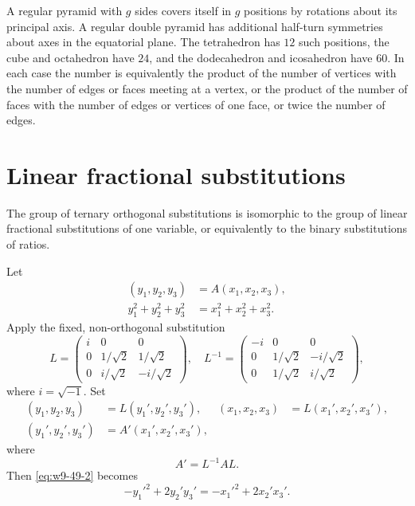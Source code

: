 \documentclass[11pt]{article}
\begin{document}
A regular pyramid with $g$ sides covers itself in $g$ positions by rotations about its principal axis.  A regular double pyramid has additional half-turn symmetries about axes in the equatorial plane.  The tetrahedron has $12$ such positions, the cube and octahedron have $24$, and the dodecahedron and icosahedron have $60$.  In each case the number is equivalently the product of the number of vertices with the number of edges or faces meeting at a vertex, or the product of the number of faces with the number of edges or vertices of one face, or twice the number of edges.

\section{Linear fractional substitutions}

The group of ternary orthogonal substitutions is isomorphic to the group of linear fractional substitutions of one variable, or equivalently to the binary substitutions of ratios.

Let
\begin{align}
 (y_1,y_2,y_3)&=A(x_1,x_2,x_3),\label{eq:w9-49-1}\\
 y_1^2+y_2^2+y_3^2&=x_1^2+x_2^2+x_3^2.\label{eq:w9-49-2}
\end{align}
Apply the fixed, non-orthogonal substitution
\begin{equation}\label{eq:w9-L}
 L=\begin{pmatrix}
 i&0&0\\
 0&1/\sqrt2&1/\sqrt2\\
 0&i/\sqrt2&-i/\sqrt2
 \end{pmatrix},
\quad
 L^{-1}=\begin{pmatrix}
 -i&0&0\\
 0&1/\sqrt2&-i/\sqrt2\\
 0&1/\sqrt2&i/\sqrt2
 \end{pmatrix},
\end{equation}
where $i=\sqrt{-1}$.  Set
\begin{align}
 (y_1,y_2,y_3)&=L(y_1',y_2',y_3'),
 & (x_1,x_2,x_3)&=L(x_1',x_2',x_3'),\label{eq:w9-49-4}\\
 (y_1',y_2',y_3')&=A'(x_1',x_2',x_3'),\label{eq:w9-49-5}
\end{align}
where
\begin{equation}\label{eq:w9-Apr}
 A'=L^{-1}AL.
\end{equation}
Then \eqref{eq:w9-49-2} becomes
\begin{equation}\label{eq:w9-nullquad}
 -y_1'^2+2y_2'y_3'=-x_1'^2+2x_2'x_3'.
\end{equation}
\end{document}
